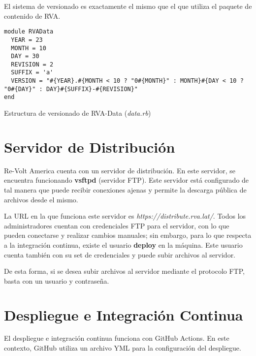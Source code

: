 El sistema de versionado es exactamente el mismo que el que utiliza el paquete de contenido de RVA.

\begin{longlisting}
  \begin{verbatim}  
module RVAData
  YEAR = 23
  MONTH = 10
  DAY = 30
  REVISION = 2
  SUFFIX = 'a'
  VERSION = "#{YEAR}.#{MONTH < 10 ? "0#{MONTH}" : MONTH}#{DAY < 10 ? "0#{DAY}" : DAY}#{SUFFIX}-#{REVISION}"
end
  \end{verbatim}
  \caption[Esquema de versionado de RVA-Data]{Estructura de versionado de RVA-Data (\textit{data.rb})}
\end{longlisting}

\newpage

\section{Servidor de Distribución}
Re-Volt America cuenta con un servidor de distribución. En este servidor, se encuentra funcionando \textbf{vsftpd} (servidor FTP). Este servidor está configurado de tal manera que puede recibir conexiones ajenas y permite la descarga pública de archivos desde el mismo.

La URL en la que funciona este servidor es \textit{https://distribute.rva.lat/}. Todos los administradores cuentan con credenciales FTP para el servidor, con lo que pueden conectarse y realizar cambios manuales; sin embargo, para lo que respecta a la integración continua, existe el usuario \textbf{deploy} en la máquina. Este usuario cuenta también con su set de credenciales y puede subir archivos al servidor.

De esta forma, si se desea subir archivos al servidor mediante el protocolo FTP, basta con un usuario y contraseña.

\newpage

\section{Despliegue e Integración Continua}
El despliegue e integración continua funciona con GitHub Actions. En este contexto, GitHub utiliza un archivo YML para la configuración del despliegue.

